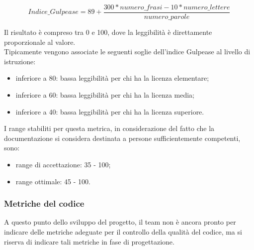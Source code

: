 		\begin{equation}\label{Indice Gulpease}
		Indice\_Gulpease = 89+ \frac{300*numero\_frasi-10*numero\_lettere}{numero\_parole}
		\end{equation}
			
		Il risultato è compreso tra 0 e 100, dove la leggibilità è direttamente proporzionale al valore.\\
		Tipicamente vengono associate le seguenti soglie dell'indice Gulpease al livello di istruzione:
		\begin{itemize}
			\item inferiore a 80: bassa leggibilità per chi ha la licenza elementare;
			\item inferiore a 60: bassa leggibilità per chi ha la licenza media;
			\item inferiore a 40: bassa leggibilità per chi ha la licenza superiore.
		\end{itemize}
		
		I range stabiliti per questa metrica, in considerazione del fatto che la documentazione si considera destinata a persone sufficientemente competenti, sono:
		\begin{itemize}
			\item range di accettazione: 35 - 100;
			\item range ottimale: 45 - 100.
		\end{itemize}
	\subsubsection{Metriche del codice}
		A questo punto dello sviluppo del progetto, il team non è ancora pronto per indicare delle metriche adeguate per il controllo della qualità del codice, ma si riserva di indicare tali metriche in fase di progettazione.